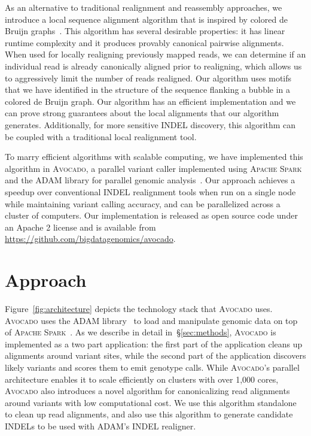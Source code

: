 \documentclass{bioinfo}
\begin{document}
As an alternative to traditional realignment and reassembly approaches, we
introduce a local sequence alignment algorithm that is inspired by colored de
Bruijn graphs~\citep{iqbal12}. This algorithm has several desirable properties:
it has linear runtime complexity and it produces provably canonical pairwise
alignments. When used for locally realigning previously mapped reads, we can
determine if an individual read is already canonically aligned prior to
realigning, which allows us to aggressively limit the number of reads realigned.
Our algorithm uses motifs that we have identified in the structure of the
sequence flanking a bubble in a colored de Bruijn graph. Our algorithm has an
efficient implementation and we can prove strong guarantees about the local
alignments that our algorithm generates. Additionally, for more sensitive
INDEL discovery, this algorithm can be coupled with a traditional local
realignment tool.

To marry efficient algorithms with scalable computing, we have implemented this algorithm in
\textsc{Avocado}, a parallel variant caller implemented using \textsc{Apache
Spark}~\citep{zaharia12, zaharia10} and the \textsc{ADAM} library for parallel
genomic analysis~\citep{massie13, nothaft15}. Our approach achieves a
speedup over conventional INDEL realignment tools when run on a single node
while maintaining variant calling accuracy, and can be parallelized across a
cluster of computers. Our implementation is released as open source code under
an Apache 2 license and is available from
\url{https://github.com/bigdatagenomics/avocado}.

\section{Approach}
\label{sec:approach}

Figure~\ref{fig:architecture} depicts the technology stack that \textsc{Avocado}
uses. \textsc{Avocado} uses the \textsc{ADAM} library~\citep{massie13, nothaft15}
to load and manipulate genomic data on top of \textsc{Apache
Spark}~\citep{zaharia10, zaharia12}. As we describe in detail
in~\S\ref{sec:methods}, \textsc{Avocado} is implemented as a two part application:
the first part of the application cleans up alignments around variant sites, while
the second part of the application discovers likely variants and scores them to
emit genotype calls. While \textsc{Avocado}'s parallel architecture enables it to
scale efficiently on clusters with over 1,000 cores, \textsc{Avocado} also
introduces a novel algorithm for canonicalizing read alignments around variants
with low computational cost. We use this algorithm standalone to clean up read
alignments, and also use this algorithm to generate candidate INDELs to be used
with \textsc{ADAM}'s INDEL realigner.
\end{document}
